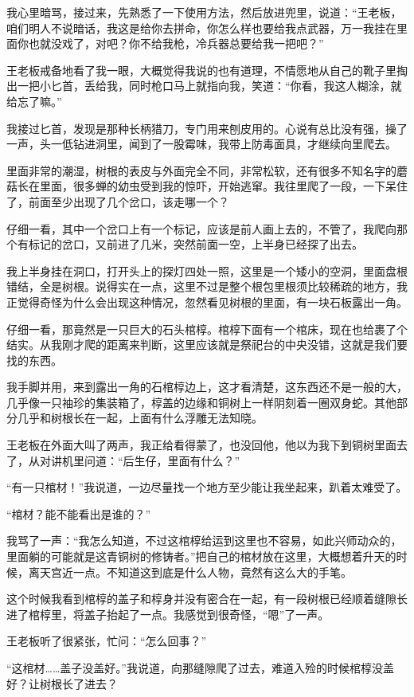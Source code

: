 我心里暗骂，接过来，先熟悉了一下使用方法，然后放进兜里，说道：“王老板，咱们明人不说暗话，我这是给你去拼命，你怎么样也要给我点武器，万一我挂在里面你也就没戏了，对吧？你不给我枪，冷兵器总要给我一把吧？”

王老板戒备地看了我一眼，大概觉得我说的也有道理，不情愿地从自己的靴子里掏出一把小匕首，丢给我，同时枪口马上就指向我，笑道：“你看，我这人糊涂，就给忘了嘛。”

我接过匕首，发现是那种长柄猎刀，专门用来刨皮用的。心说有总比没有强，操了一声，头一低钻进洞里，闻到了一股霉味，我带上防毒面具，才继续向里爬去。

里面非常的潮湿，树根的表皮与外面完全不同，非常松软，还有很多不知名字的蘑菇长在里面，很多蝉的幼虫受到我的惊吓，开始逃窜。我往里爬了一段，一下呆住了，前面至少出现了几个岔口，该走哪一个？

仔细一看，其中一个岔口上有一个标记，应该是前人画上去的，不管了，我爬向那个有标记的岔口，又前进了几米，突然前面一空，上半身已经探了出去。

我上半身挂在洞口，打开头上的探灯四处一照，这里是一个矮小的空洞，里面盘根错结，全是树根。说得实在一点，这里不过是整个根包里根须比较稀疏的地方，我正觉得奇怪为什么会出现这种情况，忽然看见树根的里面，有一块石板露出一角。

仔细一看，那竟然是一只巨大的石头棺椁。棺椁下面有一个棺床，现在也给裹了个结实。从我刚才爬的距离来判断，这里应该就是祭祀台的中央没错，这就是我们要找的东西。

我手脚并用，来到露出一角的石棺椁边上，这才看清楚，这东西还不是一般的大，几乎像一只袖珍的集装箱了，椁盖的边缘和铜树上一样阴刻着一圈双身蛇。其他部分几乎和树根长在一起，上面有什么浮雕无法知晓。

王老板在外面大叫了两声，我正给看得蒙了，也没回他，他以为我下到铜树里面去了，从对讲机里问道：“后生仔，里面有什么？”

“有一只棺材！”我说道，一边尽量找一个地方至少能让我坐起来，趴着太难受了。

“棺材？能不能看出是谁的？”

我骂了一声：“我怎么知道，不过这棺椁给运到这里也不容易，如此兴师动众的，里面躺的可能就是这青铜树的修铸者。”把自己的棺材放在这里，大概想着升天的时候，离天宫近一点。不知道这到底是什么人物，竟然有这么大的手笔。

这个时候我看到棺椁的盖子和椁身并没有密合在一起，有一段树根已经顺着缝隙长进了棺椁里，将盖子抬起了一点。我感觉到很奇怪，“嗯”了一声。

王老板听了很紧张，忙问：“怎么回事？”

“这棺材……盖子没盖好。”我说道，向那缝隙爬了过去，难道入殓的时候棺椁没盖好？让树根长了进去？

